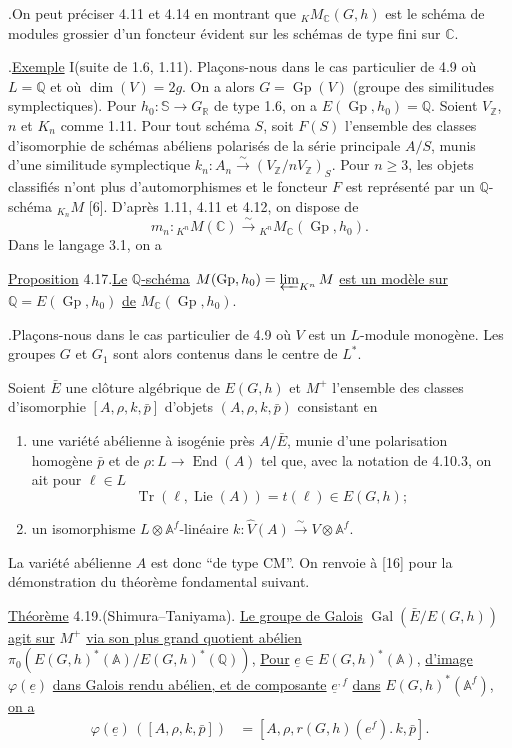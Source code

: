 \documentclass[10pt]{article}
\newcommand{\A}{\mathbb A}
\newcommand{\Af}{\mathbb A^f}
\newcommand{\C}{\mathbb C}
\newcommand{\Q}{\mathbb Q}
\newcommand{\R}{\mathbb R}
\newcommand{\Z}{\mathbb Z}
\newcommand{\bS}{\mathbb S}
\newcommand{\Gp}{\operatorname{Gp}}
\newcommand{\Lie}{\operatorname{Lie}}
\newcommand{\Gal}{\operatorname{Gal}}
\newcommand{\End}{\operatorname{End}}
\newcommand{\Tr}{\operatorname{Tr}}
\begin{document}
.\quad On peut préciser 4.11 et 4.14 en montrant que ${}_K M_{\C}(G,h)$ est le schéma de modules grossier d'un foncteur évident sur les schémas de type fini sur $\C$.

.\quad \uline{Exemple} I\quad (suite de 1.6, 1.11). Plaçons-nous dans le cas particulier de 4.9 où $L=\Q$ et où $\dim(V)=2g$. On a alors $G=\Gp(V)$ (groupe des similitudes symplectiques). Pour $h_0:\bS\longrightarrow G_\R$ de type 1.6, on a $E(\Gp,h_0)=\Q$. Soient $V_\Z$, $n$ et $K_n$ comme 1.11. Pour tout schéma $S$, soit $F(S)$ l'ensemble des classes d'isomorphie de schémas abéliens polarisés de la série principale $A/S$, munis d'une similitude symplectique $k_n:A_n\xrightarrow{\sim}(V_\Z/nV_\Z)_S$. Pour $n\geq3$, les objets classifiés n'ont plus d'automorphismes et le foncteur $F$ est représenté par un $\Q$-schéma ${}_{K_n}M$ [6]. D'après 1.11, 4.11 et 4.12, on dispose de
\[
m_n:{}_{K^n}M(\C)\xrightarrow{\sim}{}_{K^n}M_{\C}(\Gp,h_0).
\]
Dans le langage 3.1, on a

\noindent \uline{Proposition} 4.17.\quad \uline{Le} \uline{$\Q$-schéma} $M(\Gp,h_0)=\varprojlim_{K^n}M$ \uline{est un modèle sur} $\Q=E(\Gp,h_0)$ \uline{de} $M_{\C}(\Gp,h_0)$.

.\quad Plaçons-nous dans le cas particulier de 4.9 où $V$ est un $L$-module monogène. Les groupes $G$ et $G_1$ sont alors contenus dans le centre de $L^*$.

Soient $\bar E$ une clôture algébrique de $E(G,h)$ et $M^+$ l'ensemble des classes
d'isomorphie $[A,\rho,k,\bar p]$ d'objets $(A,\rho,k,\bar p)$ consistant en
\begin{enumerate}[label=(\alph*)]
\item une variété abélienne à isogénie près $A/\bar E$, munie d'une polarisation homogène $\bar p$ et de $\rho:L\to\End(A)$ tel que, avec la notation de 4.10.3, on ait pour $\ell\in L$
\[
\Tr(\ell,\Lie(A))=t(\ell)\in E(G,h);
\]
\item un isomorphisme $L\otimes\Af$-linéaire $k:\widehat V(A)\xrightarrow{\sim}V\otimes\Af$.
\end{enumerate}
La variété abélienne $A$ est donc ``de type CM''. On renvoie à [16] pour la démonstration du théorème fondamental suivant.

\noindent \uline{Théorème} 4.19.\quad (Shimura--Taniyama). \uline{Le groupe de Galois} $\Gal(\bar E/E(G,h))$ \uline{agit sur} $M^+$ \uline{via son plus grand quotient abélien} $\pi_0(E(G,h)^*(\A)/E(G,h)^*(\Q))$, \uline{Pour} $\underline{e}\in E(G,h)^*(\A)$, \uline{d'image} $\varphi(\underline{e})$ \uline{dans Galois rendu abélien, et de composante} $\underline{e}^{,f}$ \uline{dans} $E(G,h)^*(\Af)$, \uline{on a}
\begingroup
\makeatletter
\tagsleft@true
\makeatother
\begin{align}
\varphi(\underline{e})\,([A,\rho,k,\bar p])&=[A,\rho,r(G,h)(e^f).\,k,\bar p].\tag{4.19.1}
\end{align}
\endgroup
\end{document}
